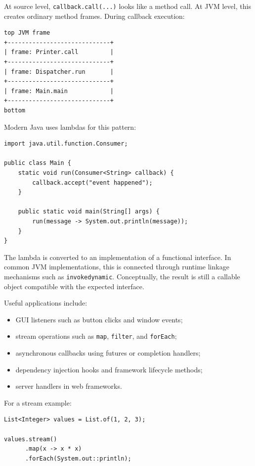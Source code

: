 At source level, \texttt{callback.call(...)} looks like a method call. At JVM level, this creates ordinary method frames. During callback execution:

\begin{verbatim}
top JVM frame
+-----------------------------+
| frame: Printer.call         |
+-----------------------------+
| frame: Dispatcher.run       |
+-----------------------------+
| frame: Main.main            |
+-----------------------------+
bottom
\end{verbatim}

Modern Java uses lambdas for this pattern:

\begin{verbatim}
import java.util.function.Consumer;

public class Main {
    static void run(Consumer<String> callback) {
        callback.accept("event happened");
    }

    public static void main(String[] args) {
        run(message -> System.out.println(message));
    }
}
\end{verbatim}

The lambda is converted to an implementation of a functional interface. In common JVM implementations, this is connected through runtime linkage mechanisms such as \texttt{invokedynamic}. Conceptually, the result is still a callable object compatible with the expected interface.

Useful applications include:

\begin{itemize}
    \item GUI listeners such as button clicks and window events;
    \item stream operations such as \texttt{map}, \texttt{filter}, and \texttt{forEach};
    \item asynchronous callbacks using futures or completion handlers;
    \item dependency injection hooks and framework lifecycle methods;
    \item server handlers in web frameworks.
\end{itemize}

For a stream example:

\begin{verbatim}
List<Integer> values = List.of(1, 2, 3);

values.stream()
      .map(x -> x * x)
      .forEach(System.out::println);
\end{verbatim}


